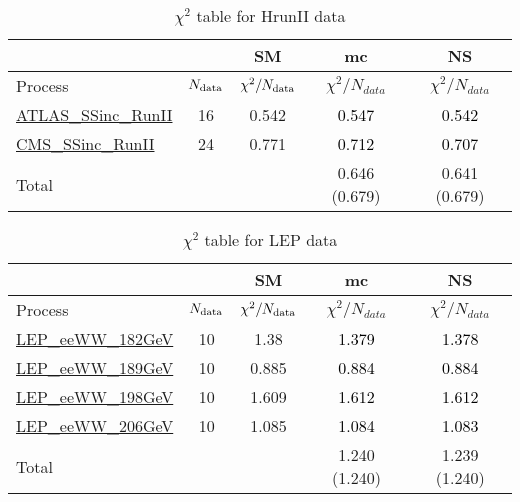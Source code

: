 \documentclass{article}
\begin{document}
\begin{table}[H]
\centering
\begin{tabular}{|l|c|c|c|c|}
\hline
 \multicolumn{2}{|c|}{} & SM& mc& NS\\ \hline
Process & $N_{\rm data}$ & $\chi^ 2/N_{\rm data}$& $\chi^ 2/N_{data}$& $\chi^ 2/N_{data}$\\ \hline
\href{https://arxiv.org/abs/1909.02845}{ATLAS_SSinc_RunII} & 16 & 0.542 & \textcolor{black}{0.547} & \textcolor{black}{0.542} \\ \hline
\href{https://arxiv.org/abs/1809.10733}{CMS_SSinc_RunII} & 24 & 0.771 & \textcolor{black}{0.712} & \textcolor{black}{0.707} \\ \hline
\hline Total & &  & 0.646 (0.679) & 0.641 (0.679) \\ \hline
\end{tabular}
\caption{$\chi^2$ table for HrunII data}
\end{table}
\begin{table}[H]
\centering
\begin{tabular}{|l|c|c|c|c|}
\hline
 \multicolumn{2}{|c|}{} & SM& mc& NS\\ \hline
Process & $N_{\rm data}$ & $\chi^ 2/N_{\rm data}$& $\chi^ 2/N_{data}$& $\chi^ 2/N_{data}$\\ \hline
\href{https://arxiv.org/abs/1302.3415}{LEP_eeWW_182GeV} & 10 & 1.38 & \textcolor{black}{1.379} & \textcolor{black}{1.378} \\ \hline
\href{https://arxiv.org/abs/1302.3415}{LEP_eeWW_189GeV} & 10 & 0.885 & \textcolor{black}{0.884} & \textcolor{black}{0.884} \\ \hline
\href{https://arxiv.org/abs/1302.3415}{LEP_eeWW_198GeV} & 10 & 1.609 & \textcolor{black}{1.612} & \textcolor{black}{1.612} \\ \hline
\href{https://arxiv.org/abs/1302.3415}{LEP_eeWW_206GeV} & 10 & 1.085 & \textcolor{black}{1.084} & \textcolor{black}{1.083} \\ \hline
\hline Total & &  & 1.240 (1.240) & 1.239 (1.240) \\ \hline
\end{tabular}
\caption{$\chi^2$ table for LEP data}
\end{table}
\end{document}
